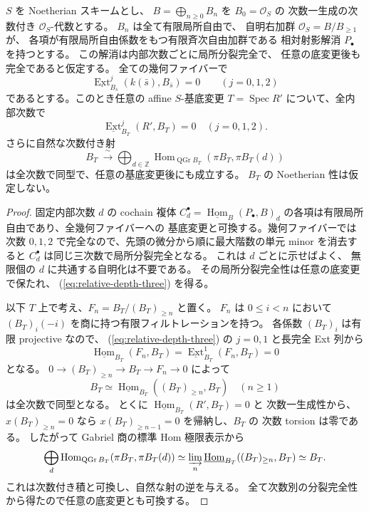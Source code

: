 \begin{lemma}
\label{lem:relative-depth-three-saturation}
$S$ を Noetherian スキームとし、
$B=\bigoplus_{n\ge0}B_n$ を $B_0=\mathcal O_S$ の
次数一生成の次数付き $\mathcal O_S$-代数とする。
$B_n$ は全て有限局所自由で、
自明右加群 $\mathcal O_S=B/B_{\ge1}$ が、
各項が有限局所自由係数をもつ有限斉次自由加群である
相対射影解消 $P_\bullet$ を持つとする。
この解消は内部次数ごとに局所分裂完全で、
任意の底変更後も完全であると仮定する。
全ての幾何ファイバーで
\[
  \underline{\operatorname{Ext}}_{B_{\bar s}}^j
        (k(\bar s),B_{\bar s})=0\qquad(j=0,1,2)
  \tag{Depth-3}\label{eq:relative-fibre-depth-three}
\]
であるとする。このとき任意の affine $S$-基底変更
$T=\operatorname{Spec}R'$ について、全内部次数で
\[
 \underline{\operatorname{Ext}}_{B_T}^j(R',B_T)=0
 \quad(j=0,1,2).
 \tag{Rel-depth}\label{eq:relative-depth-three}
\]
さらに自然な次数付き射
\[
B_T\ \xrightarrow{\ \sim\ }
 \bigoplus_{d\in\mathbb Z}
 \operatorname{Hom}_{\operatorname{QGr}B_T}
      (\pi B_T,\pi B_T(d))
 \tag{Saturation}\label{eq:relative-full-saturation}
\]
は全次数で同型で、任意の基底変更後にも成立する。
$B_T$ の Noetherian 性は仮定しない。
\end{lemma}
\begin{proof}
固定内部次数 $d$ の cochain 複体
$C_d^\bullet=\underline{\operatorname{Hom}}_B(P_\bullet,B)_d$
の各項は有限局所自由であり、全幾何ファイバーへの
基底変更と可換する。幾何ファイバーでは次数 $0,1,2$
で完全なので、先頭の微分から順に最大階数の単元 minor を消去すると
$C_d^\bullet$ は同じ三次数で局所分裂完全となる。
これは $d$ ごとに示せばよく、
無限個の $d$ に共通する自明化は不要である。
その局所分裂完全性は任意の底変更で保たれ、
(\ref{eq:relative-depth-three}) を得る。

以下 $T$ 上で考え、$F_n=B_T/(B_T)_{\ge n}$ と置く。
$F_n$ は $0\le i<n$ において
$(B_T)_i(-i)$ を商に持つ有限フィルトレーションを持つ。
各係数 $(B_T)_i$ は有限 projective なので、
(\ref{eq:relative-depth-three}) の $j=0,1$
と長完全 Ext 列から
\[
 \underline{\operatorname{Hom}}_{B_T}(F_n,B_T)
 =\underline{\operatorname{Ext}}_{B_T}^1(F_n,B_T)=0
\]
となる。
$0\to(B_T)_{\ge n}\to B_T\to F_n\to0$ によって
\[
 B_T\simeq
 \underline{\operatorname{Hom}}_{B_T}((B_T)_{\ge n},B_T)
 \quad(n\ge1)
\]
は全次数で同型となる。
とくに $\underline{\operatorname{Hom}}_{B_T}(R',B_T)=0$ と
次数一生成性から、$x(B_T)_{\ge n}=0$ なら
$x(B_T)_{\ge n-1}=0$ を帰納し、$B_T$ の
次数 torsion は零である。
したがって Gabriel 商の標準 Hom 極限表示から
\[
 \bigoplus_d\operatorname{Hom}_{\operatorname{QGr}B_T}
          (\pi B_T,\pi B_T(d))
 \simeq\varinjlim_n
 \underline{\operatorname{Hom}}_{B_T}((B_T)_{\ge n},B_T)
 \simeq B_T.
\]
これは次数付き積と可換し、自然な射の逆を与える。
全て次数別の分裂完全性から得たので任意の底変更とも可換する。
\end{proof}

